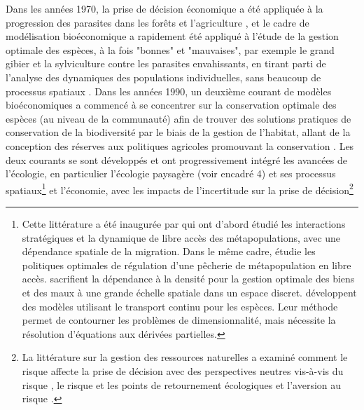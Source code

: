 Dans les années 1970, la prise de décision économique a été appliquée à la progression des parasites dans les forêts et l'agriculture \citep{Hueth1974, Feder1975}, et le cadre de modélisation bioéconomique a rapidement été appliqué à l'étude de la gestion optimale des espèces, à la fois "bonnes" et "mauvaises", par exemple le grand gibier et la sylviculture contre les parasites envahissants, en tirant parti de l'analyse des dynamiques des populations individuelles, sans beaucoup de processus spatiaux \citep{swanson_economics_1994, Skonhoft1999_on,ALEXANDER2000, Horan2002}.  Dans les années 1990, un deuxième courant de modèles bioéconomiques a commencé à se concentrer sur la conservation optimale des espèces (au niveau de la communauté) afin de trouver des solutions pratiques de conservation de la biodiversité par le biais de la gestion de l'habitat, allant de la conception des réserves aux politiques agricoles promouvant la conservation \citep{costello_dynamic_2004, Polasky2001,Polasky2005, Watzold2016a, Mouysset2011}. Les deux courants se sont développés et ont progressivement intégré les avancées de l'écologie, en particulier l'écologie paysagère (voir encadré 4) et ses processus spatiaux\footnote{Cette littérature a été inaugurée par \cite{huffaker_optimal_1992, brown_metapopulation_1997, sanchirico_bioeconomics_1999} qui ont d'abord étudié les interactions stratégiques et la dynamique de libre accès des métapopulations, avec une dépendance spatiale de la migration. Dans le même cadre, \cite{SANCHIRICO200523} étudie les politiques optimales de régulation d'une pêcherie de métapopulation en libre accès. \cite{costello_optimal_2008, blackwood_cost-effective_2010} sacrifient la dépendance à la densité pour la gestion optimale des biens et des maux à une grande échelle spatiale dans un espace discret. \cite{brock_pattern_2010, brock_2020} développent des modèles utilisant le transport continu pour les espèces. Leur méthode permet de contourner les problèmes de dimensionnalité, mais nécessite la résolution d'équations aux dérivées partielles.} et l'économie, avec les impacts de l'incertitude sur la prise de décision\footnote{La littérature sur la gestion des ressources naturelles a examiné comment le risque affecte la prise de décision avec des perspectives neutres vis-à-vis du risque \citep{reed_1979_optimal, costello_optimal_2008}, le risque et les points de retournement écologiques \citep{costello_renewable_2019} et l'aversion au risque \citep{McGoughPlantingaCostello+2009,
kapaun_does_2013,TAHVONEN2018659}.
}
